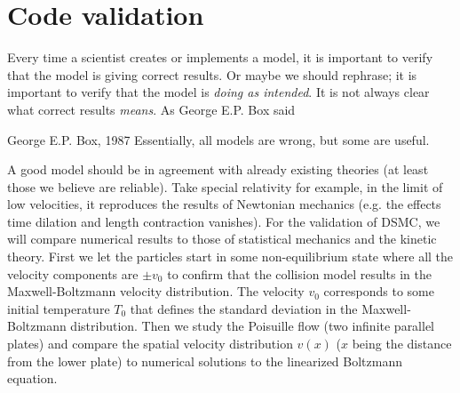 \section{Code validation}
Every time a scientist creates or implements a model, it is important to verify that the model is giving correct results. Or maybe we should rephrase; it is important to verify that the model is \textit{doing as intended}. It is not always clear what correct results \textit{means}. As George E.P. Box said
\begin{aquote}{George E.P. Box, 1987}
Essentially, all models are wrong, but some are useful.
\end{aquote}
A good model should be in agreement with already existing theories (at least those we believe are reliable). Take special relativity for example, in the limit of low velocities, it reproduces the results of Newtonian mechanics (e.g. the effects time dilation and length contraction vanishes). For the validation of DSMC, we will compare numerical results to those of statistical mechanics and the kinetic theory. First we let the particles start in some non-equilibrium state where all the velocity components are $\pm v_0$ to confirm that the collision model results in the Maxwell-Boltzmann velocity distribution. The velocity $v_0$ corresponds to some initial temperature $T_0$ that defines the standard deviation in the Maxwell-Boltzmann distribution. Then we study the Poisuille flow (two infinite parallel plates) and compare the spatial velocity distribution $v(x)$ ($x$ being the distance from the lower plate) to numerical solutions to the linearized Boltzmann equation.
